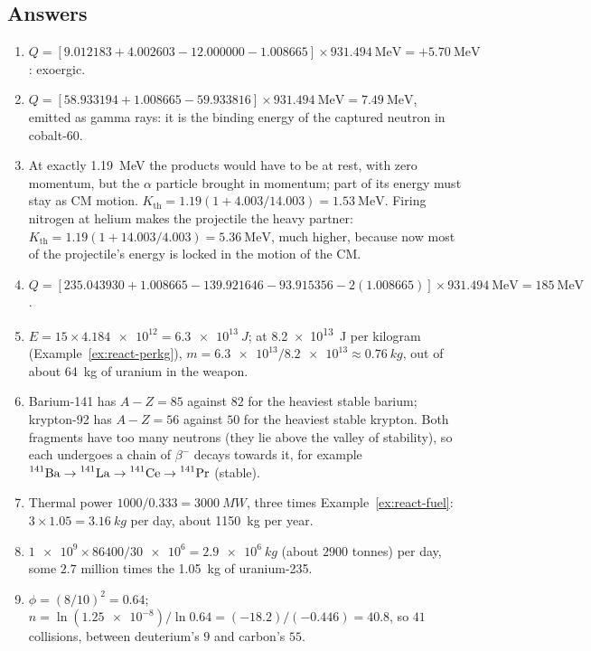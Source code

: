 \subsection*{Answers}
{\small
\begin{enumerate}[itemsep=2pt]
\item $Q=[\num{9.012183}+\num{4.002603}-\num{12.000000}-\num{1.008665}]\times\SI{931.494}{\MeV}=+\SI{5.70}{\MeV}$:
      exoergic.
\item $Q=[\num{58.933194}+\num{1.008665}-\num{59.933816}]\times\SI{931.494}{\MeV}=\SI{7.49}{\MeV}$, emitted
      as gamma rays: it is the binding energy of the captured neutron in cobalt-60.
\item At exactly \SI{1.19}{\MeV} the products would have to be at rest, with zero momentum, but the
      $\alpha$ particle brought in momentum; part of its energy must stay as CM motion.
      $K_{\text{th}}=1.19(1+4.003/14.003)=\SI{1.53}{\MeV}$. Firing nitrogen at helium makes the projectile
      the heavy partner: $K_{\text{th}}=1.19(1+14.003/4.003)=\SI{5.36}{\MeV}$, much higher, because now
      most of the projectile's energy is locked in the motion of the CM.
\item $Q=[\num{235.043930}+\num{1.008665}-\num{139.921646}-\num{93.915356}-2(\num{1.008665})]\times\SI{931.494}{\MeV}=\SI{185}{\MeV}$.
\item $E=15\times\num{4.184e12}=\SI{6.3e13}{J}$; at \SI{8.2e13}{J} per kilogram (Example~\ref{ex:react-perkg}),
      $m=\num{6.3e13}/\num{8.2e13}\approx\SI{0.76}{kg}$, out of about \SI{64}{kg} of uranium in the weapon.
\item Barium-141 has $A-Z=85$ against $82$ for the heaviest stable barium; krypton-92 has $A-Z=56$ against
      $50$ for the heaviest stable krypton. Both fragments have too many neutrons (they lie above the
      valley of stability), so each undergoes a chain of $\beta^-$ decays towards it, for example
      $\prescript{141}{}{\mathrm{Ba}}\to\prescript{141}{}{\mathrm{La}}\to\prescript{141}{}{\mathrm{Ce}}\to\prescript{141}{}{\mathrm{Pr}}$ (stable).
\item Thermal power $1000/0.333=\SI{3000}{MW}$, three times Example~\ref{ex:react-fuel}: $3\times1.05=\SI{3.16}{kg}$
      per day, about \SI{1150}{kg} per year.
\item $\num{1e9}\times\num{86400}/\num{30e6}=\SI{2.9e6}{kg}$ (about $2900$ tonnes) per day, some $2.7$
      million times the \SI{1.05}{kg} of uranium-235.
\item $\phi=(8/10)^2=0.64$; $n=\ln(\num{1.25e-8})/\ln0.64=(-18.2)/(-0.446)=40.8$, so $41$ collisions,
      between deuterium's $9$ and carbon's $55$.

\end{enumerate}}
